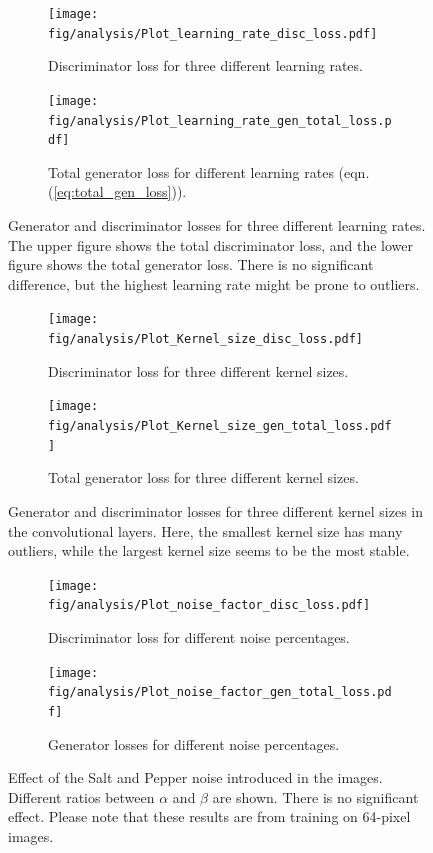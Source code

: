 \begin{figure}
	\centering
	\begin{subfigure}{\linewidth}
		\centering
		\texttt{[image: fig/analysis/Plot\_learning\_rate\_disc\_loss.pdf]}
		\caption{Discriminator loss for three different learning rates. }
		\label{fig:Plot_learning_rate_discloss}
	\end{subfigure}\hfill
	\begin{subfigure}{\linewidth}
		\centering
		\texttt{[image: fig/analysis/Plot\_learning\_rate\_gen\_total\_loss.pdf]}
		\caption{Total generator loss for different learning rates (eqn. (\ref{eq:total_gen_loss})).}
		\label{fig:Plot_learning_rate_genloss}
	\end{subfigure}\hfill
	\caption{Generator and discriminator losses for three different learning rates. The upper figure shows the total discriminator loss, and the lower figure shows the total generator loss. There is no significant difference, but the highest learning rate might be prone to outliers. }
	\label{fig:Plot_learning_rate_loss}
\end{figure}
\begin{figure}
	\centering
	\begin{subfigure}{\linewidth}
		\centering
		\texttt{[image: fig/analysis/Plot\_Kernel\_size\_disc\_loss.pdf]}
		\caption{Discriminator loss for three different kernel sizes. }
		\label{fig:Plot_kernel_size_discloss}
	\end{subfigure}\hfill
	\begin{subfigure}{\linewidth}
		\centering
		\texttt{[image: fig/analysis/Plot\_Kernel\_size\_gen\_total\_loss.pdf]}
		\caption{Total generator loss for three different kernel sizes.}
		\label{fig:Plot_kernel_size_genloss}
	\end{subfigure}\hfill
	\caption{Generator and discriminator losses for three different kernel sizes in the convolutional layers. Here, the smallest kernel size has many outliers, while the largest kernel size seems to be the most stable.}
	\label{fig:Plot_kernel_size_loss}
\end{figure}
\begin{figure}
	\centering
	\begin{subfigure}{0.5\linewidth}
		\centering
		\texttt{[image: fig/analysis/Plot\_noise\_factor\_disc\_loss.pdf]}
		\caption{Discriminator loss for different noise percentages.}
		\label{fig:Plot_noise_discloss}
	\end{subfigure}\hfill
	\begin{subfigure}{0.5\linewidth}
		\centering
		\texttt{[image: fig/analysis/Plot\_noise\_factor\_gen\_total\_loss.pdf]}
		\caption{Generator losses for different noise percentages.}
		\label{fig:Plot_noise_genloss}
	\end{subfigure}\hfill
	\caption{Effect of the Salt and Pepper noise introduced in the images. Different ratios between $\alpha$ and $\beta$ are shown. There is no significant effect. Please note that these results are from training on 64-pixel images.}
	\label{fig:Plot_noise_loss}
\end{figure}
